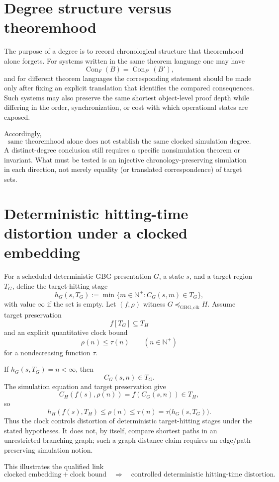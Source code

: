 \documentclass[11pt]{article}
\theoremstyle{remark}
\newcommand{\Npos}{\mathbb N^{+}}
\newcommand{\Con}{\operatorname{Con}}
\begin{document}
\section{Degree structure versus theoremhood}

The purpose of a degree is to record chronological structure that theoremhood alone forgets.
For systems written in the same theorem language one may have
\[
\Con_F(B)=\Con_{F'}(B'),
\]
and for different theorem languages the corresponding statement should be made only after fixing an
explicit translation that identifies the compared consequences.  Such systems may also preserve the same
shortest object-level proof depth while differing in the order, synchronization, or cost with which
operational states are exposed.

Accordingly,
\[
\boxed{\text{same theoremhood alone does not establish the same clocked simulation degree}.}
\]
A distinct-degree conclusion still requires a specific nonsimulation theorem or invariant.
What must be tested is an injective chronology-preserving simulation in each direction, not merely equality
(or translated correspondence) of target sets.

\section{Deterministic hitting-time distortion under a clocked embedding}

For a scheduled deterministic GBG presentation \(G\), a state \(s\), and a target region \(T_G\), define the
target-hitting stage
\[
h_G(s,T_G):=\min\{m\in\Npos:C_G(s,m)\in T_G\},
\]
with value \(\infty\) if the set is empty.  Let \((f,\rho)\) witness
\(G\preceq_{\mathrm{GBG,clk}}H\).  Assume target preservation
\[
f[T_G]\subseteq T_H
\]
and an explicit quantitative clock bound
\[
\rho(n)\le \tau(n)
\qquad(n\in\Npos)
\]
for a nondecreasing function \(\tau\).

If \(h_G(s,T_G)=n<\infty\), then
\[
C_G(s,n)\in T_G.
\]
The simulation equation and target preservation give
\[
C_H(f(s),\rho(n))=f(C_G(s,n))\in T_H,
\]
so
\[
h_H(f(s),T_H)\le \rho(n)\le \tau(n)
      =\tau\bigl(h_G(s,T_G)\bigr).
\]
Thus the clock controls distortion of deterministic target-hitting stages under the stated hypotheses.
It does not, by itself, compare shortest paths in an unrestricted branching graph; such a graph-distance
claim requires an edge/path-preserving simulation notion.

This illustrates the qualified link
\[
\boxed{\text{clocked embedding}+\text{clock bound}\quad\Longrightarrow\quad
       \text{controlled deterministic hitting-time distortion}.}
\]
\end{document}
